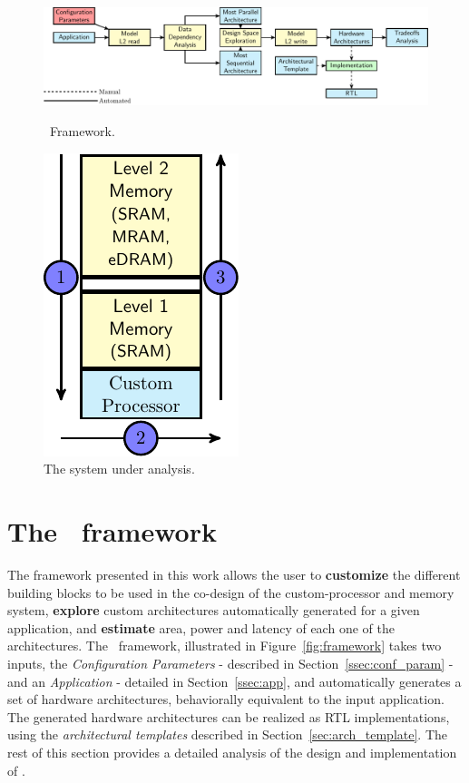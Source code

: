 \begin{figure}[ht]
\begin{minipage}{.7\textwidth}
\includegraphics[width=\textwidth,left]{images/framework.pdf}
  \caption{\small \frameworkname~Framework.}{}
  \label{fig:framework}
\end{minipage}%
\begin{minipage}{.2\textwidth}
    \centering
\includegraphics[width=.5\textwidth]{images/architecture.pdf}
\caption{\small The system under analysis. 
    }
\label{fig:system}
\end{minipage}
\squeezeup
\squeezeup
\end{figure}
\section{The \frameworkname~framework}
\label{sec:framework}
The framework presented in this work allows the user to \textbf{customize} the different building blocks to be used in the co-design of the custom-processor and memory system, \textbf{explore} custom architectures automatically generated for a given application, and \textbf{estimate} area, power and latency of each one of the architectures. The \frameworkname~framework, illustrated in Figure~\ref{fig:framework} takes two inputs, the \textit{Configuration Parameters} - described in Section~\ref{ssec:conf_param} - and an \textit{Application} - detailed in Section~\ref{ssec:app}, and automatically generates a set of hardware architectures, behaviorally equivalent to the input application. 
The generated hardware architectures can be realized as RTL implementations, using the \textit{architectural templates} described in Section~\ref{sec:arch_template}.
The rest of this section provides a detailed analysis of the design and implementation of \frameworkname.
 
